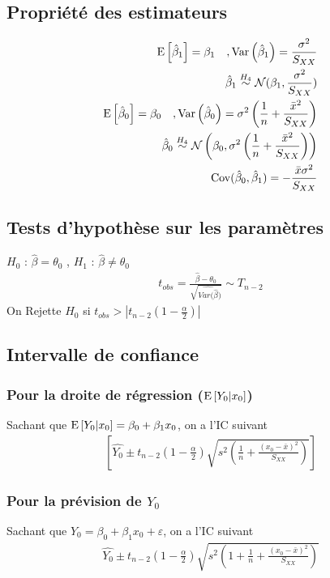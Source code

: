 \documentclass[10pt, french]{article}
\begin{document}
\begin{multicols*}{3}
\subsection*{Propriété des estimateurs}
\begin{align*}
\mathrm{E} \left[ \hat{\beta}_1 \right] = \beta_1 \quad , \mathrm{Var} \left( \hat{\beta}_1 \right) = \frac{\sigma^2}{S_{XX}} \\
\hat{\beta}_1 \overset{H_4}{\sim} \mathcal{N}(\beta_1, \frac{\sigma^2}{S_{XX}}) \\
\mathrm{E} \left[ \hat{\beta}_0 \right] = \beta_0 \quad , \mathrm{Var} \left( \hat{\beta}_0 \right) = \sigma^2 \left( \frac{1}{n} + \frac{\bar{x}^2}{S_{XX}} \right) \\
\hat{\beta}_0 \overset{H_4}{\sim} \mathcal{N} \left(\beta_0, \sigma^2 \left( \frac{1}{n}  + \frac{\bar{x}^2}{S_{XX}} \right) \right) \\
\mathrm{Cov}(\hat{\beta}_0, \hat{\beta}_1) = - \frac{\bar{x} \sigma^2}{S_{XX}}
\end{align*}

\subsection*{Tests d'hypothèse sur les paramètres}
$H_0$ : $\hat{\beta} = \theta_0$ , $H_1$ : $\hat{\beta} \neq \theta_0$
\begin{align*}
t_{obs} = \frac{\hat{\beta} - \theta_0}{\sqrt{\hat{Var(\hat{\beta}})}} \sim T_{n-2}
\end{align*}
On Rejette $H_0$ si $t_{obs} > | t_{n-2} (1 - \frac{\alpha}{2})|$

\subsection*{Intervalle de confiance}
\subsubsection*{Pour la droite de régression ($\mathrm{E} \left[ Y_0|x_0 \right]$)}
Sachant que $\mathrm{E} \left[ Y_0 | x_0 \right] = \beta_0 + \beta_1 x_0$, on a l'IC suivant
\begin{align*}
\left[ \hat{Y_0} \pm t_{n-2} \left(1 - \frac{\alpha}{2} \right) \sqrt{s^2 \left( \frac{1}{n} + \frac{(x_0 - \bar{x})^2}{S_{XX}} \right)} \right]
\end{align*}

\subsubsection*{Pour la prévision de $Y_0$}
Sachant que $Y_0 = \beta_0 + \beta_1 x_0 + \varepsilon$, on a l'IC suivant
\begin{align*}
\hat{Y_0} \pm t_{n-2} \left(1 - \frac{\alpha}{2} \right) \sqrt{s^2 \left( 1 + \frac{1}{n} + \frac{(x_0 - \bar{x})^2}{S_{XX}} \right)}
\end{align*}


\end{multicols*}
\end{document}
